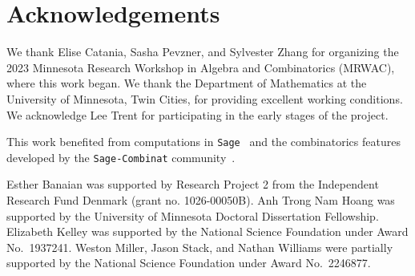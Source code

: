 \documentclass[a4paper,10pt,leqno]{amsart}
\numberwithin{equation}{section}
\theoremstyle{definition}
\theoremstyle{remark}
\begin{document}
\section*{Acknowledgements}
We thank Elise Catania, Sasha Pevzner, and Sylvester Zhang for organizing the 2023 Minnesota Research Workshop in Algebra and Combinatorics (MRWAC), where this work began.  We thank the Department of Mathematics at the University of Minnesota, Twin Cities, for providing excellent working conditions.  We acknowledge Lee Trent for participating in the early stages of the project.

This work benefited from computations in \texttt{Sage}~\cite{sagemath} and the combinatorics features developed by the \texttt{Sage-Combinat} community~\cite{Sage-Combinat}.

Esther Banaian was supported by Research Project 2 from the Independent Research Fund Denmark (grant no. 1026-00050B). Anh Trong Nam Hoang was supported by the University of Minnesota Doctoral Dissertation Fellowship. Elizabeth Kelley was supported by the National Science Foundation under Award No.\ 1937241. Weston Miller, Jason Stack, and Nathan Williams were partially supported by the National Science Foundation under Award No.\ 2246877.


\end{document}

